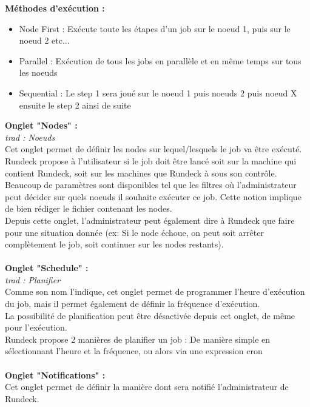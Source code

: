 \documentclass[12pt]{article}
\begin{document}
\textbf{Méthodes d'exécution :}
\begin{itemize}
    \item Node First : Exécute toute les étapes d'un job sur le noeud 1, puis sur le noeud 2 etc...
    \item Parallel : Exécution de tous les jobs en parallèle et en même temps sur tous les noeuds
    \item Sequential : Le step 1 sera joué sur le noeud 1 puis noeuds 2 puis noeud X ensuite le step 2 ainsi de suite
\end{itemize}
\vspace{0.2cm}
\textbf{Onglet "Nodes" :}
\\
\textit{trad : Noeuds}
\\
Cet onglet permet de définir les nodes sur lequel/lesquels le job va être exécuté. Rundeck propose à l'utilisateur si le job doit être lancé soit sur la machine qui contient Rundeck, soit sur les machines que Rundeck à sous son contrôle.
\\
Beaucoup de paramètres sont disponibles tel que les filtres où l'administrateur peut décider sur quels noeuds il souhaite exécuter ce job. Cette notion implique de bien rédiger le fichier contenant les nodes.
\\
Depuis cette onglet, l'administrateur peut également dire à Rundeck que faire pour une situation donnée (ex: Si le node échoue, on peut soit arrêter complètement le job, soit continuer sur les nodes restants).
\\
\vspace{0.2cm}
\\
\textbf{Onglet "Schedule" :}
\\
\textit{trad : Planifier}
\\
Comme son nom l'indique, cet onglet permet de programmer l'heure d'exécution du job, mais il permet également de définir la fréquence d'exécution.
\\
La possibilité de planification peut être désactivée depuis cet onglet, de même pour l'exécution.
\\
Rundeck propose 2 manières de planifier un job :  De manière simple en sélectionnant l'heure et la fréquence, ou alors via une expression cron 
\\
\vspace{0.2cm}
\\
\textbf{Onglet "Notifications" :}
\\
Cet onglet permet de définir la manière dont sera notifié l'administrateur de Rundeck.
\\
\end{document}
